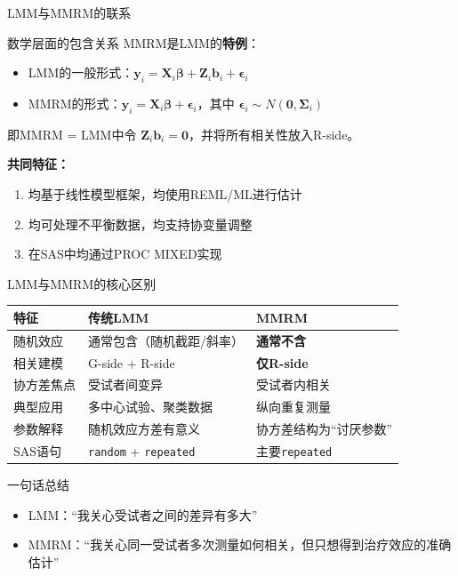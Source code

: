 \documentclass[aspectratio=169,11pt]{beamer}
\newcommand{\by}{\mathbf{y}}
\newcommand{\bX}{\mathbf{X}}
\newcommand{\bZ}{\mathbf{Z}}
\newcommand{\bbeta}{\boldsymbol{\beta}}
\newcommand{\bepsilon}{\boldsymbol{\epsilon}}
\newcommand{\bSigma}{\boldsymbol{\Sigma}}
\newcommand{\bi}{\mathbf{b}_i}
\begin{document}
\begin{frame}{LMM与MMRM的联系}
\begin{block}{数学层面的包含关系}
MMRM是LMM的\textbf{特例}：
\begin{itemize}
    \item LMM的一般形式：$\by_i = \bX_i\bbeta + \bZ_i\bi + \bepsilon_i$
    \item MMRM的形式：$\by_i = \bX_i\bbeta + \bepsilon_i$，其中 $\bepsilon_i \sim N(\mathbf{0}, \bSigma_i)$
\end{itemize}
即MMRM = LMM中令 $\bZ_i\bi = \mathbf{0}$，并将所有相关性放入R-side。
\end{block}

\vspace{0.2cm}
\textbf{共同特征：}
\begin{enumerate}
    \item 均基于线性模型框架，均使用REML/ML进行估计
    \item 均可处理不平衡数据，均支持协变量调整
    \item 在SAS中均通过PROC MIXED实现
\end{enumerate}
\end{frame}

\begin{frame}{LMM与MMRM的核心区别}
\begin{center}
\small
\begin{tabular}{p{3cm}p{4.2cm}p{4.2cm}}
\toprule
\textbf{特征} & \textbf{传统LMM} & \textbf{MMRM} \\
\midrule
随机效应 & 通常包含（随机截距/斜率） & \textbf{通常不含} \\
相关建模 & G-side + R-side & \textbf{仅R-side} \\
协方差焦点 & 受试者间变异 & 受试者内相关 \\
典型应用 & 多中心试验、聚类数据 & 纵向重复测量 \\
参数解释 & 随机效应方差有意义 & 协方差结构为``讨厌参数'' \\
SAS语句 & \texttt{random} + \texttt{repeated} & 主要\texttt{repeated} \\
\bottomrule
\end{tabular}
\end{center}

\vspace{0.2cm}
\begin{exampleblock}{一句话总结}
\begin{itemize}
    \item LMM：``我关心受试者之间的差异有多大''
    \item MMRM：``我关心同一受试者多次测量如何相关，但只想得到治疗效应的准确估计''
\end{itemize}
\end{exampleblock}
\end{frame}
\end{document}
